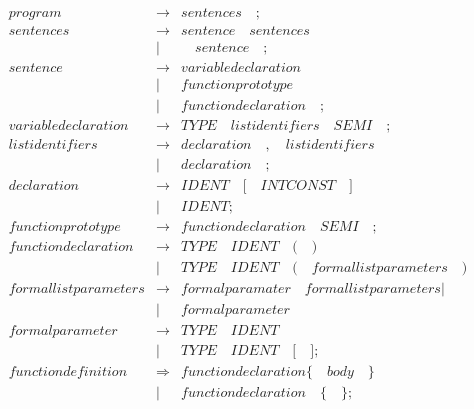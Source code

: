 \documentclass{article}
\begin{document}
\begin{eqnarray}
  \mathit{program} & \rightarrow & \mathit{sentences} \quad ;
  \\
    \mathit{sentences} & \rightarrow & \mathit{sentence} \quad \mathit{sentences} \quad  \\
    & | & \quad \mathit{sentence} \quad ;
    \\
      \mathit{sentence} & \rightarrow & \mathit{variabledeclaration} \quad \\
      & |& \mathit{functionprototype} \quad \\
      & |& \mathit{functiondeclaration} \quad ;
\\
  \mathit{variabledeclaration} & \rightarrow & \mathit{TYPE} \quad \mathit{listidentifiers} \quad \mathit{SEMI} \quad ; 
  \\
  \mathit{listidentifiers} & \rightarrow & \mathit{declaration} \quad \mathit{,} \quad \mathit{listidentifiers} \quad   \\
  &  |& \mathit{declaration} \quad ; \\
  \mathit{declaration} & \rightarrow & \mathit{IDENT} \quad \mathit{[} \quad  \mathit{INTCONST} \quad \mathit{]} \quad  \\
  & | & \mathit{IDENT} ;  \\
  \mathit{functionprototype} & \rightarrow &  \mathit{functiondeclaration}  \quad \mathit{SEMI} \quad ;\\
  \mathit{functiondeclaration} & \rightarrow & \mathit{TYPE} \quad \mathit{IDENT} \quad  \mathit{(} \quad\mathit{)} \\
  & | & \mathit{TYPE}\quad\mathit{IDENT} \quad \mathit{(} \quad \mathit{formallistparameters} \quad \mathit{)}  \\ 
   \mathit{formallistparameters} & \rightarrow & \mathit{formalparamater} \quad \mathit{formallistparameters}  | \\
   & | & \mathit{formalparameter} \\
   \mathit{formalparameter} & \rightarrow & \mathit{TYPE} \quad \mathit{IDENT}  \\
   & | & \mathit{TYPE} \quad \mathit{IDENT} \quad \mathit{[} \quad \mathit{]} ; \\
   \mathit{functiondefinition} & \Rightarrow & \mathit{functiondeclaration} \mathit{\{}\quad \mathit{body}  \quad \mathit{\}}  \\
   & | & \mathit{functiondeclaration} \quad \mathit{\{} \quad \mathit{\}} ;  \\

\end{eqnarray}
\end{document}
